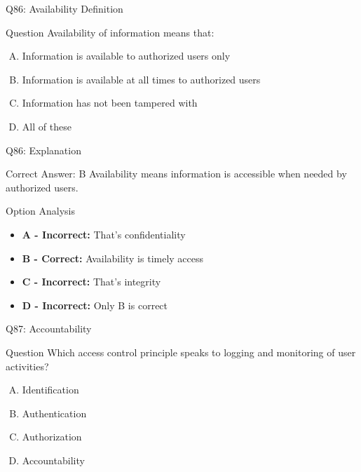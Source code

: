 \documentclass{beamer}
\begin{document}
	\begin{frame}{Q86: Availability Definition}
		\begin{block}{Question}
			Availability of information means that:
		\end{block}
		\begin{enumerate}[(A)]
			\item Information is available to authorized users only
			\item Information is available at all times to authorized users
			\item Information has not been tampered with
			\item All of these
		\end{enumerate}
	\end{frame}
	
	\begin{frame}{Q86: Explanation}
		\begin{block}{Correct Answer: B}
			Availability means information is accessible when needed by authorized users.
		\end{block}
		\begin{block}{Option Analysis}
			\begin{itemize}
				\item \textbf{A - Incorrect:} That's confidentiality
				\item \textbf{B - Correct:} Availability is timely access
				\item \textbf{C - Incorrect:} That's integrity
				\item \textbf{D - Incorrect:} Only B is correct
			\end{itemize}
		\end{block}
	\end{frame}
	
	\begin{frame}{Q87: Accountability}
		\begin{block}{Question}
			Which access control principle speaks to logging and monitoring of user activities?
		\end{block}
		\begin{enumerate}[(A)]
			\item Identification
			\item Authentication
			\item Authorization
			\item Accountability
		\end{enumerate}
	\end{frame}
	
\end{document}
